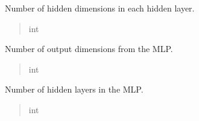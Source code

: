 \documentclass[letterpaper,10pt,english]{sphinxmanual}
\begin{document}
\begin{fulllineitems}
\begin{fulllineitems}
\begin{quote}
\begin{description}
\end{description}\end{quote}

\end{fulllineitems}


\begin{fulllineitems}
\label{\detokenize{api:hypyml.configs.MLPConfig.num_hidden_dim}}
\pysigstartsignatures
{}
\pysigstopsignatures
\sphinxAtStartPar
Number of hidden dimensions in each hidden layer.
\begin{quote}\begin{description}
\sphinxAtStartPar
int

\end{description}\end{quote}

\end{fulllineitems}


\begin{fulllineitems}
\label{\detokenize{api:hypyml.configs.MLPConfig.num_output_dim}}
\pysigstartsignatures
{}
\pysigstopsignatures
\sphinxAtStartPar
Number of output dimensions from the MLP.
\begin{quote}\begin{description}
\sphinxAtStartPar
int

\end{description}\end{quote}

\end{fulllineitems}


\begin{fulllineitems}
\label{\detokenize{api:hypyml.configs.MLPConfig.num_hidden_layers}}
\pysigstartsignatures
{}
\pysigstopsignatures
\sphinxAtStartPar
Number of hidden layers in the MLP.
\begin{quote}\begin{description}
\sphinxAtStartPar
int


\end{description}
\end{quote}
\end{fulllineitems}
\end{fulllineitems}
\end{document}
